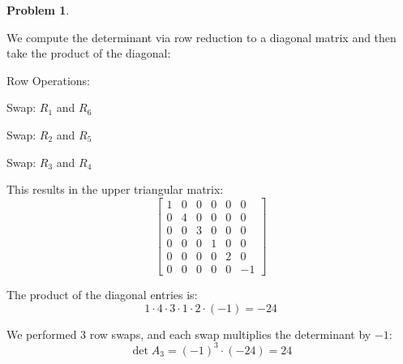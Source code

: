 \documentclass[12pt, oneside]{amsart}
\theoremstyle{definition}
\newtheorem{prob}{Problem}
\begin{document}
\begin{prob}
\begin{enumerate}
    \begin{solution}
    We compute the determinant via row reduction to a diagonal matrix and then take the product of the diagonal:
    
    Row Operations:
    
    Swap: $R_1$ and $R_6$

    Swap: $R_2$ and $R_5$

    Swap: $R_3$ and $R_4$

    This results in the upper triangular matrix:
    \[
    \begin{bmatrix}
    1 & 0 & 0 & 0 & 0 & 0 \\
    0 & 4 & 0 & 0 & 0 & 0 \\
    0 & 0 & 3 & 0 & 0 & 0 \\
    0 & 0 & 0 & 1 & 0 & 0 \\
    0 & 0 & 0 & 0 & 2 & 0 \\
    0 & 0 & 0 & 0 & 0 & -1
    \end{bmatrix}
    \]
    
    The product of the diagonal entries is:
    \[
    1 \cdot 4 \cdot 3 \cdot 1 \cdot 2 \cdot (-1) = -24
    \]
    
    We performed 3 row swaps, and each swap multiplies the determinant by $-1$:
    \[
    \det A_3 = (-1)^3 \cdot (-24) = 24
    \]
    \end{solution}
\end{enumerate}
\end{prob}
\end{document}
